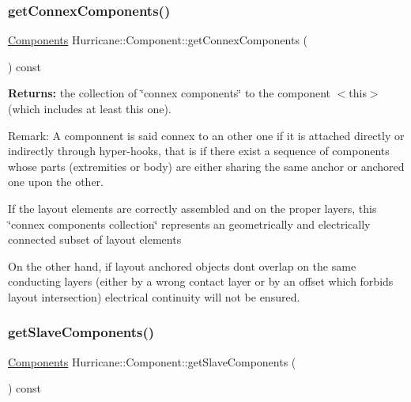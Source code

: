 \subsubsection{\texorpdfstring{get\+Connex\+Components()}{getConnexComponents()}}
{\footnotesize\ttfamily \mbox{\hyperlink{namespaceHurricane_a7d26d99aeb5dd6d70d51bd35d2473e72}{Components}} Hurricane\+::\+Component\+::get\+Connex\+Components (\begin{DoxyParamCaption}{ }\end{DoxyParamCaption}) const}

{\bfseries Returns\+:} the collection of \char`\"{}connex components\char`\"{} to the component {\ttfamily $<$this$>$} (which includes at least this one).

\begin{DoxyParagraph}{Remark\+: A componnent is said connex to an other one if it is }
attached directly or indirectly through hyper-\/hooks, that is if there exist a sequence of components whose parts (extremities or body) are either sharing the same anchor or anchored one upon the other.
\end{DoxyParagraph}
If the layout elements are correctly assembled and on the proper layers, this \char`\"{}connex components collection\char`\"{} represents an geometrically and electrically connected subset of layout elements

On the other hand, if layout anchored objects don\textquotesingle{}t overlap on the same conducting layers (either by a wrong contact layer or by an offset which forbids layout intersection) electrical continuity will not be ensured. \mbox{\label{classHurricane_1_1Component_af6d6b7c6b3cb18754cfa02bc5fb1e754}} 
\subsubsection{\texorpdfstring{get\+Slave\+Components()}{getSlaveComponents()}}
{\footnotesize\ttfamily \mbox{\hyperlink{namespaceHurricane_a7d26d99aeb5dd6d70d51bd35d2473e72}{Components}} Hurricane\+::\+Component\+::get\+Slave\+Components (\begin{DoxyParamCaption}{ }\end{DoxyParamCaption}) const}

